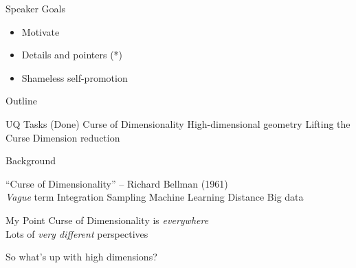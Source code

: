 \documentclass[14pt]{beamer}
\begin{document}
\begin{frame}{Speaker Goals}
  \begin{itemize}
  \item Motivate
  \item Details and pointers (*)
  \item Shameless self-promotion
  \end{itemize}
\end{frame}

\begin{frame}{Outline}
  \begin{outline}
  \1 UQ Tasks (Done)
  \1 Curse of Dimensionality
    \2 High-dimensional geometry
  \1 Lifting the Curse
    \2 Dimension reduction
  \end{outline}
\end{frame}

\begin{frame}{Background}
  \begin{outline}
  \1 ``Curse of Dimensionality'' -- Richard Bellman (1961) \\
  \1 \emph{Vague} term
    \2 Integration
    \2 Sampling
    \2 Machine Learning
    \2 Distance
    \2 Big data
  \end{outline}
\end{frame}


\begin{frame}{My Point}
  Curse of Dimensionality is \emph{everywhere} \\
  Lots of \emph{very different} perspectives

  \bigskip
  So what's up with high dimensions?
\end{frame}

\end{document}
